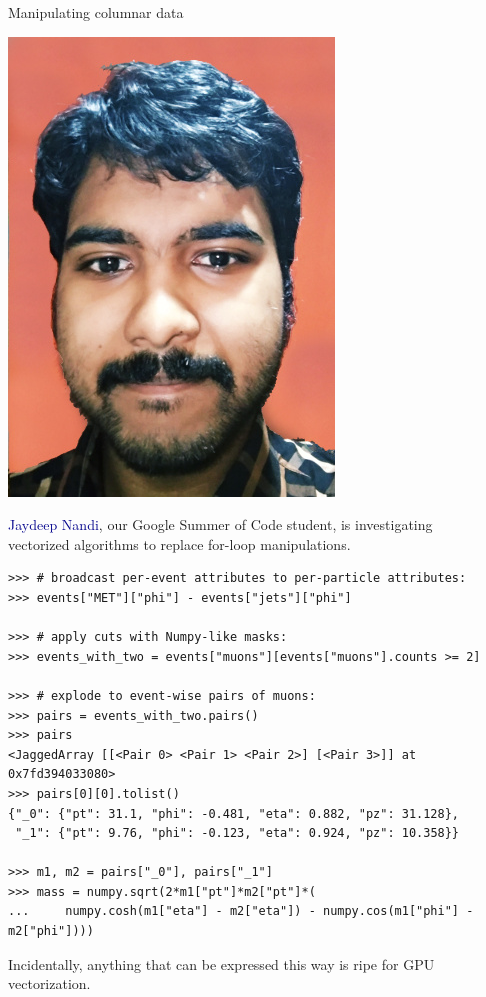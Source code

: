\documentclass[aspectratio=169]{beamer}
\begin{document}
\begin{frame}[fragile]{Manipulating columnar data}
\vspace{0.3 cm}

\hfill \includegraphics[height=3 cm]{jaydeep.jpg}

\vspace{-3 cm}
\textcolor{darkblue}{Jaydeep Nandi}, our Google Summer of Code student, is investigating \\
vectorized algorithms to replace for-loop manipulations.

\vspace{0.1 cm}
\scriptsize
\begin{verbatim}
>>> # broadcast per-event attributes to per-particle attributes:
>>> events["MET"]["phi"] - events["jets"]["phi"]

>>> # apply cuts with Numpy-like masks:
>>> events_with_two = events["muons"][events["muons"].counts >= 2]

>>> # explode to event-wise pairs of muons:
>>> pairs = events_with_two.pairs()
>>> pairs
<JaggedArray [[<Pair 0> <Pair 1> <Pair 2>] [<Pair 3>]] at 0x7fd394033080>
>>> pairs[0][0].tolist()
{"_0": {"pt": 31.1, "phi": -0.481, "eta": 0.882, "pz": 31.128},
 "_1": {"pt": 9.76, "phi": -0.123, "eta": 0.924, "pz": 10.358}}

>>> m1, m2 = pairs["_0"], pairs["_1"]
>>> mass = numpy.sqrt(2*m1["pt"]*m2["pt"]*(
...     numpy.cosh(m1["eta"] - m2["eta"]) - numpy.cos(m1["phi"] - m2["phi"])))
\end{verbatim}

\normalsize
\vspace{0.1 cm}
Incidentally, anything that can be expressed this way is ripe for GPU vectorization.
\end{frame}
\end{document}
